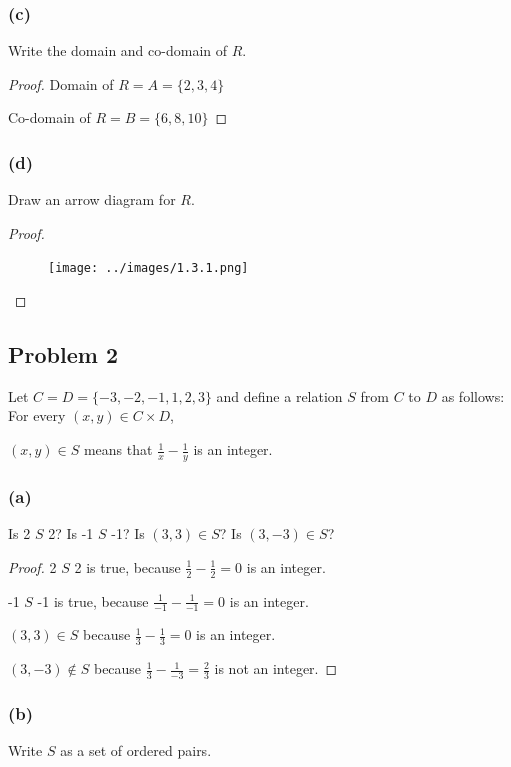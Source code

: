 \documentclass[14pt]{extarticle}
\newcommand{\dps}{\displaystyle}
\begin{document}
\subsubsection{(c)}
Write the domain and co-domain of $R$.

\begin{proof}
    Domain of $R = A = \{2, 3, 4\}$

    Co-domain of $R = B = \{6, 8, 10\}$
\end{proof}

\subsubsection{(d)}
Draw an arrow diagram for $R$.

\begin{proof}
    \begin{figure}[ht!]
        \centering
        \texttt{[image: ../images/1.3.1.png]}
    \end{figure}
\end{proof}

\subsection{Problem 2}
Let $C = D = \{-3, -2, -1, 1, 2, 3\}$ and define a relation $S$ from $C$ to
$D$ as follows: For every $(x, y) \in C \times D$,

\begin{center}
    $(x, y) \in S$ means that $\dps \frac{1}{x} - \frac{1}{y}$ is an integer.
\end{center}

\subsubsection{(a)}
Is 2 $S$ 2? Is -1 $S$ -1? Is $(3, 3) \in S$? Is $(3, -3) \in S$?

\begin{proof}
    2 $S$ 2 is true, because $\dps \frac{1}{2} - \frac{1}{2} = 0$ is an integer.

    -1 $S$ -1 is true, because $\dps \frac{1}{-1} - \frac{1}{-1} = 0$ is an integer.

    $(3, 3) \in S$ because $\dps \frac{1}{3} - \frac{1}{3} = 0$ is an integer.

    $(3, -3) \notin S$ because $\dps \frac{1}{3} - \frac{1}{-3} = \frac{2}{3}$
    is not an integer.
\end{proof}

\subsubsection{(b)}
Write $S$ as a set of ordered pairs.
\end{document}
